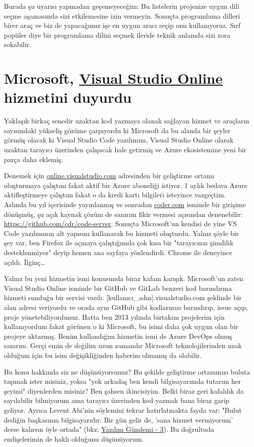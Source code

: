 \documentclass[11pt]{article}
\begin{document}
Burada şu uyarısı yapmadan geçemeyeceğim: Bu listelerin projenize uygun dili
seçme aşamasında sizi etkilemesine izin vermeyin. Sonuçta programlama dilleri
birer araç ve biz de yapacağımız işe en uygun aracı seçip onu kullanıyoruz.
Sırf popüler diye bir programlama dilini seçmek ileride teknik anlamda sizi
zora sokabilir.
\section{Microsoft, \href{https://visualstudio.microsoft.com/services/visual-studio-online/}{Visual Studio Online} hizmetini duyurdu}
\label{sec:org484a768}
Yaklaşık birkaç senedir uzaktan kod yazmaya olanak sağlayan hizmet ve
araçların sayısındaki yükseliş gözüme çarpıyordu ki Microsoft da bu alanda bir
şeyler görmüş olacak ki Visual Studio Code yazılımını, Visual Studio Online
olarak uzaktan tarayıcı üzerinden çalışacak hale getirmiş ve Azure
ekosistemine yeni bir parça daha eklemiş.

Denemek için \href{https://online.visualstudio.com}{online.visualstudio.com} adresinden bir geliştirme ortamı
oluşturmaya çalıştım fakat aktif bir Azure aboneliği istiyor. 1 aylık bedava
Azure aktifleştirmeye çalıştım fakat o da kredi kartı bilgileri isteyince
vazgeçtim. Aslında bu yıl içerisinde yayınlanmış ve sonradan \href{https://coder.com}{coder.com} isminde
bir girişime dönüşmüş, şu açık kaynak çözüm de sanırım fikir vermesi açısından
denenebilir: \url{https://github.com/cdr/code-server}. Sonuçta Microsoft'un kendisi
de yine VS Code yazılımının alt yapısını kullanarak bu hizmeti oluşturdu.
Yalnız şöyle bir şey var, ben Firefox ile açmaya çalıştığımda çok kısa bir
"tarayıcınız şimdilik desteklenmiyor" deyip hemen ana sayfaya yönlendirdi.
Chrome ile deneyince açıldı. İlginç\ldots{}

Yalnız bu yeni hizmetin ismi konusunda biraz kafam karışık. Microsoft'un zaten
Visual Studio Online isminde bir GitHub ve GitLab benzeri kod barındırma
hizmeti sunduğu bir servisi vardı. [kullanıcı\_adın].visualstudio.com şeklinde
bir alan adresi veriyordu ve orada aynı GitHub gibi kodlarınızı barındırıp,
issue açıp, proje yönetebiliyordunuz. Hatta ben 2013 yılında birtakım
projelerim için kullanıyordum fakat görünen o ki Microsoft, bu isimi daha çok
uygun olan bir projeye aktarmış. Benim kullandığım hizmetin ismi de Azure
DevOps olmuş sanırım. Gerçi emin de değilim uzun zamandır Microsoft
teknolojilerinden uzak olduğum için bu isim değişikliğinden haberim olmamış da
olabilir.

Bu konu hakkında siz ne düşünüyorsunuz? Bu şekilde geliştirme ortamınızı buluta
taşımak ister misiniz, yoksa "yok arkadaş ben kendi bilgisayarımda tutarım her
şeyimi" diyenlerden misiniz? Ben şahsen ikincisiyim. Belki biraz geri kafalılık
da sayılabilir bilmiyorum ama tarayıcı üzerinden kod yazmak bana biraz garip
geliyor. Ayrıca Levent Abi'nin söylemini tekrar hatırlatmakta fayda var: "Bulut
dediğin başkasının bilgisayarıdır. Bir gün gelir de, 'sana hizmet vermiyorum'
derse kalırsın öyle ortada" (bkz: \href{../03/yazilim-gundemi-03.pdf}{Yazılım Gündemi - 3}). Bu doğrultuda
endişelerimin de haklı olduğunu düşünüyorum.
\end{document}
